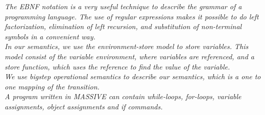 \vspace{30pt}

\textit{The EBNF notation is a very useful technique to describe the grammar of a programming language. The use of regular expressions makes it possible to do left factorization, elimination of left recursion, and substitution of non-terminal symbols in a convenient way.\\ \indent
In our semantics, we use the environment-store model to store variables. This model consist of the variable environment, where variables are referenced, and a store function, which uses the reference to find the value of the variable.\\ \indent
We use bigstep operational semantics to describe our semantics, which is a one to one mapping of the transition.\\ \indent
A program written in MASSIVE can contain while-loops, for-loops, variable assignments, object assignments and if commands.}
